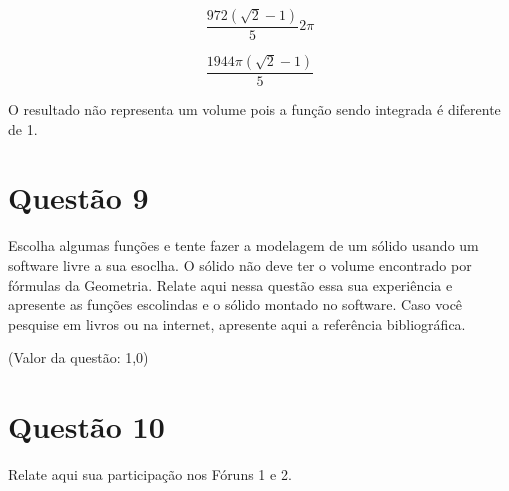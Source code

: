 \documentclass[10pt,a4paper]{article}
\begin{document}
	\begin{equation*}
		\frac{972(\sqrt{2} - 1)}{5} 2\pi
	\end{equation*}
	
	\begin{equation*}
		\frac{1944\pi(\sqrt{2} - 1)}{5}
	\end{equation*}
	
	O resultado não representa um volume pois a função sendo integrada é diferente de 1.
	
	
	\section*{Questão 9}
	
	Escolha algumas funções e tente fazer a modelagem de um sólido usando um software livre a sua esoclha. O sólido não deve ter o volume encontrado por fórmulas da Geometria. Relate aqui nessa questão essa sua experiência e apresente as funções escolindas e o sólido montado no software. Caso você pesquise em livros ou na internet, apresente aqui a referência bibliográfica.
	
	(Valor da questão: 1,0)
	
	\section*{Questão 10}
	
	Relate aqui sua participação nos Fóruns 1 e 2.
\end{document}
